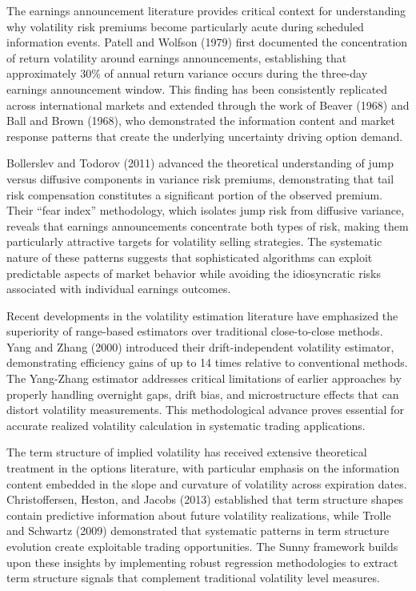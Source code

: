\documentclass[
  american,
  11pt,
  11pt,
  letterpaper,
  onecolumn]{article}
\begin{document}
The earnings announcement literature provides critical context for
understanding why volatility risk premiums become particularly acute
during scheduled information events. Patell and Wolfson (1979) first
documented the concentration of return volatility around earnings
announcements, establishing that approximately 30\% of annual return
variance occurs during the three-day earnings announcement window. This
finding has been consistently replicated across international markets
and extended through the work of Beaver (1968) and Ball and Brown
(1968), who demonstrated the information content and market response
patterns that create the underlying uncertainty driving option demand.

Bollerslev and Todorov (2011) advanced the theoretical understanding of
jump versus diffusive components in variance risk premiums,
demonstrating that tail risk compensation constitutes a significant
portion of the observed premium. Their ``fear index'' methodology, which
isolates jump risk from diffusive variance, reveals that earnings
announcements concentrate both types of risk, making them particularly
attractive targets for volatility selling strategies. The systematic
nature of these patterns suggests that sophisticated algorithms can
exploit predictable aspects of market behavior while avoiding the
idiosyncratic risks associated with individual earnings outcomes.

Recent developments in the volatility estimation literature have
emphasized the superiority of range-based estimators over traditional
close-to-close methods. Yang and Zhang (2000) introduced their
drift-independent volatility estimator, demonstrating efficiency gains
of up to 14 times relative to conventional methods. The Yang-Zhang
estimator addresses critical limitations of earlier approaches by
properly handling overnight gaps, drift bias, and microstructure effects
that can distort volatility measurements. This methodological advance
proves essential for accurate realized volatility calculation in
systematic trading applications.

The term structure of implied volatility has received extensive
theoretical treatment in the options literature, with particular
emphasis on the information content embedded in the slope and curvature
of volatility across expiration dates. Christoffersen, Heston, and
Jacobs (2013) established that term structure shapes contain predictive
information about future volatility realizations, while Trolle and
Schwartz (2009) demonstrated that systematic patterns in term structure
evolution create exploitable trading opportunities. The Sunny framework
builds upon these insights by implementing robust regression
methodologies to extract term structure signals that complement
traditional volatility level measures.
\end{document}
